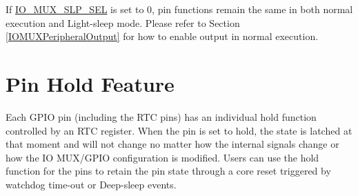 \documentclass[main\_\_EN.tex]{subfiles}
\begin{document}
\begin{tiplisting}
If \hyperref[fielddesc:IOMUXSLPSEL]{IO\_MUX\_SLP\_SEL} is set to 0, pin functions remain the same in both normal execution and Light-sleep mode. Please refer to Section \ref{IOMUXPeripheralOutput} for how to enable output in normal execution.
\end{tiplisting}

\section{Pin Hold Feature}\label{PadHold}

Each GPIO pin (including the RTC pins) has an individual hold function controlled by an RTC register. When the pin is set to hold, the state is latched at that moment and will not change no matter how the internal signals change or how the IO MUX/GPIO configuration is modified. Users can use the hold function for the pins to retain the pin state through a core reset triggered by watchdog time-out or Deep-sleep events.
\end{document}
